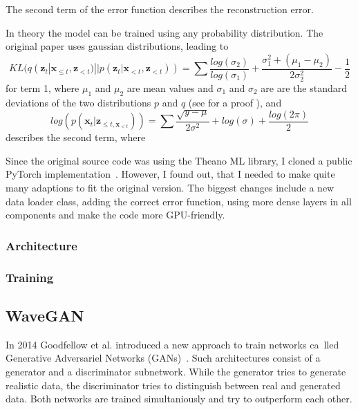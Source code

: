 \documentclass[12pt]{article}
\begin{document}
The second term of the error function describes the reconstruction error.

In theory the model can be trained using any probability distribution.
The original paper uses gaussian distributions, leading to
$$
KL(q(\mathbf{z}_t | \mathbf{x}_{\le t}, \mathbf{z}_{<t}) || p(\mathbf{z}_t | \mathbf{x}_{<t}, \mathbf{z}_{<t}))
= \sum \frac{log(\sigma_2)}{log(\sigma_1)}+\frac{\sigma_1^2 + (\mu_1 - \mu_2)}{2 \sigma_2^2} - \frac{1}{2}
$$
for term 1, where $\mu_1$ and $\mu_2$ are mean values and $\sigma_1$ and $\sigma_2$ are are the standard deviations of the two distributions $p$ and $q$ (see \cite{klproof} for a proof ), and
$$
log(p(\mathbf{x}_t | \mathbf{z}_{\le t, \mathbf{x}_{<t}}))
= \sum \frac{\sqrt{y-\mu}}{2 \sigma^2} + log(\sigma) + \frac{log(2\pi)}{2}
$$
describes the second term, where %


Since the original source code was using the Theano ML library, I cloned a public PyTorch implementation~\cite{VRNNgit}.
However, I found out, that I needed to make quite many adaptions to fit the original version.
The biggest changes include a new data loader class, adding the correct error function, using more dense layers in all components and make the code more GPU-friendly. 



\subsubsection{Architecture}
\subsubsection{Training}

\subsection{WaveGAN}
In 2014 Goodfellow et al. introduced a new approach to train networks ca lled Generative Adversariel Networks (GANs)~\cite{goodfellow2014generative}.
Such architectures consist of a generator and a discriminator subnetwork.
While the generator tries to generate realistic data, the discriminator tries to distinguish between real and generated data.
Both networks are trained simultaniously and try to outperform each other.
 

\cite{donahue2018adversarial} %
\end{document}
